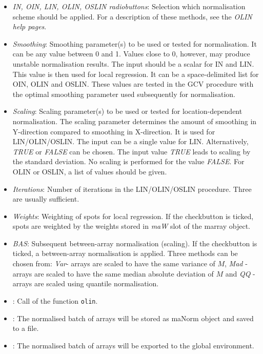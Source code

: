 \documentclass[a4paper,11pt]{article}
\begin{document}
\begin{itemize}
\item \textit{IN, OIN, LIN, OLIN, OSLIN radiobuttons}: Selection which normalisation scheme should be applied. For
a description of these methods, see the \emph{OLIN help pages}.


\item \textit{Smoothing}: Smoothing parameter(s) to be used or tested for  normalisation. It can be any 
value between 0 and 1. Values close to 0, however, may produce unstable normalisation results. 
The input  should be a scalar for IN and LIN. This value is then used for local regression. 
It can be a space-delimited list for OIN, OLIN and OSLIN. These values are tested in the GCV procedure
with the optimal smoothing parameter used subsequently for normalisation.     

\item \textit{Scaling}: Scaling parameter(s) to be used or tested  for location-dependent normalisation.
The scaling  parameter determines the amount of smoothing in Y-direction compared to smoothing
in X-direction. It is used for LIN/OLIN/OSLIN. The input can be a single value for LIN. Alternatively,
\emph{TRUE} or \emph{FALSE} can be chosen. The input value \emph{TRUE} leads to scaling by the standard 
deviation. No scaling is performed for the value \emph{FALSE}. 
For OLIN or OSLIN, a list of values should be given. 

\item \textit{Iterations}: Number of iterations in the  LIN/OLIN/OSLIN procedure. Three are usually sufficient. 

\item \textit{Weights}: Weighting of spots for local regression. If the checkbutton is ticked,
spots are weighted by the weights stored in \textit{maW} slot of the marray object.

\item \textit{BAS}: Subsequent between-array normalisation (scaling). If the checkbutton is ticked,
a between-array normalisation is applied. Three methods can be chosen from: \textit{Var}- arrays
are scaled to have the same variance of $M$,   \textit{Mad} - arrays are scaled to have the same
median absolute deviation of $M$ and \textit{QQ} - arrays are scaled using quantile normalisation. 

\item {}: Call of the function \texttt{olin}.

\item {}: The normalised batch of arrays will be stored as maNorm object and saved to a file.


\item {}: The normalised batch of arrays will be exported to the global environment.

\end{itemize}
\end{document}
